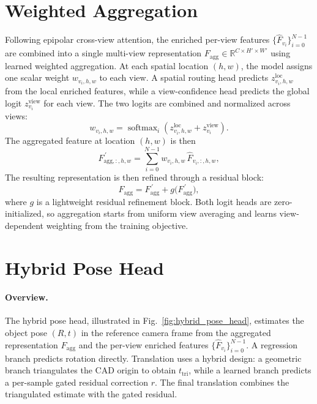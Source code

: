 \section{Weighted Aggregation}
\label{sec:aggregation}
Following epipolar cross-view attention, the enriched per-view features \(\{\hat{F}_{v_i}\}_{i=0}^{N-1}\) are combined into a single multi-view representation \(F_{\mathrm{agg}}\in\mathbb{R}^{C\times H'\times W'}\) using learned weighted aggregation.
At each spatial location \((h,w)\), the model assigns one scalar weight \(w_{v_i,h,w}\) to each view.
A spatial routing head predicts \(z^{\mathrm{loc}}_{v_i,h,w}\) from the local enriched features, while a view-confidence head predicts the global logit \(z^{\mathrm{view}}_{v_i}\) for each view.
The two logits are combined and normalized across views:
\begin{equation}
w_{v_i,h,w}
=
\operatorname{softmax}_{i}\!\left(
z^{\mathrm{loc}}_{v_i,h,w}
+
z^{\mathrm{view}}_{v_i}
\right).
\end{equation}
The aggregated feature at location \((h,w)\) is then
\begin{equation}
F^{\,\prime}_{\mathrm{agg},:,h,w}=
\sum_{i=0}^{N-1}
w_{v_i,h,w}\,\hat{F}_{v_i,:,h,w},
\end{equation}
The resulting representation is then refined through a residual block:
\begin{equation}
F_{\mathrm{agg}}=
F^{\,\prime}_{\mathrm{agg}}
+
g\bigl(F^{\,\prime}_{\mathrm{agg}}\bigr),
\end{equation}
where \(g\) is a lightweight residual refinement block.
Both logit heads are zero-initialized, so aggregation starts from uniform view averaging and learns view-dependent weighting from the training objective.


\section{Hybrid Pose Head}
\label{sec:pose_head}

\paragraph{Overview.}
The hybrid pose head, illustrated in Fig.~\ref{fig:hybrid_pose_head}, estimates the object pose \((R,t)\) in the reference camera frame from the aggregated representation \(F_{\mathrm{agg}}\) and the per-view enriched features \(\{\hat{F}_{v_i}\}_{i=0}^{N-1}\).
A regression branch predicts rotation directly.
Translation uses a hybrid design: a geometric branch triangulates the CAD origin to obtain \(t_{\mathrm{tri}}\), while a learned branch predicts a per-sample gated residual correction \(r\).
The final translation combines the triangulated estimate with the gated residual.

